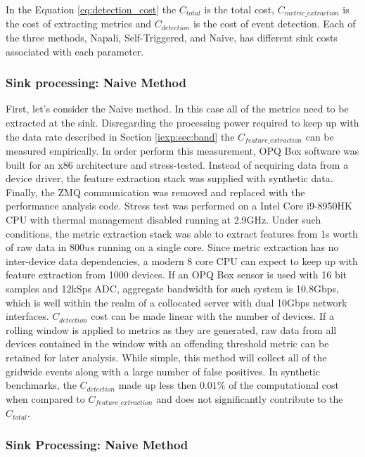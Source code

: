In the Equation \ref{eq:detection_cost} the $C_{total}$ is the total cost, $C_{metric\_extraction}$ is the cost of extracting metrics and $C_{detection}$ is the cost of event detection.\cite{de2015effective}
Each of the three methods, Napali, Self-Triggered, and Naive, has different sink costs associated with each parameter.

\subsubsection{Sink processing: Naive Method}

First, let's consider the Naive method.
In this case all of the metrics need to be extracted at the sink.
Disregarding the processing power required to keep up with the data rate described in Section \ref{iexp:sec:band} the $C_{feature\_extraction}$ can be measured empirically.
In order perform this measurement, OPQ Box software was built for an x86 architecture and stress-tested.
Instead of acquiring data from a device driver, the feature extraction stack was supplied with synthetic data.
Finally, the ZMQ communication was removed and replaced with the performance analysis code.
Stress test was performed on a Intel Core i9-8950HK CPU with thermal management disabled running at 2.9GHz.
Under such conditions, the metric extraction stack was able to extract features from 1s worth of raw data in $800us$ running on a single core.
Since metric extraction has no inter-device data dependencies, a modern 8 core CPU can expect to keep up with feature extraction from 1000 devices.
If an OPQ Box sensor is used with 16 bit samples and 12kSps ADC, aggregate bandwidth for such system is 10.8Gbps, which is well within the realm of a collocated server with dual 10Gbps network interfaces.
$C_{detection}$ cost can be made linear with the number of devices.
If a rolling window is applied to metrics as they are generated, raw data from all devices contained in the window with an offending threshold metric can be retained for later analysis.
While simple, this method will collect all of the gridwide events along with a large number of false positives.
In synthetic benchmarks, the $C_{detection}$ made up less then $0.01\%$ of the computational cost when compared to $C_{feature\_extraction}$
and does not significantly contribute to the $C_{total}$.

\subsubsection{Sink Processing: Naive Method}

